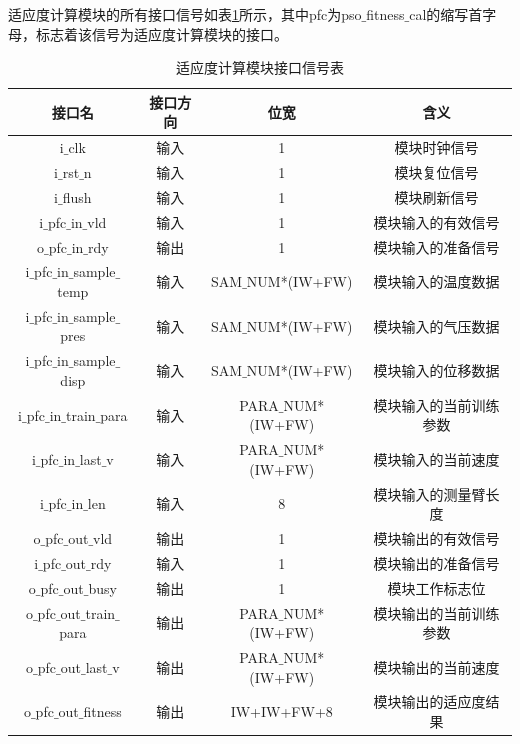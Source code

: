适应度计算模块的所有接口信号如表\ref{tab:适应度计算模块接口信号表}所示，其中pfc为pso$\_$fitness$\_$cal的缩写首字母，标志着该信号为适应度计算模块的接口。
\begin{table}[H]
    \centering
    \caption{适应度计算模块接口信号表}
    \label{tab:适应度计算模块接口信号表}
    \begin{tabular}{c|c|c|c}
        \hline
        接口名                               & 接口方向  & 位宽               &含义                        \\ \hline
        i$\_$clk                            & 输入      & 1                     & 模块时钟信号             \\ \hline
        i$\_$rst$\_$n                       & 输入      & 1                     & 模块复位信号             \\ \hline
        i$\_$flush                          & 输入      & 1                     & 模块刷新信号             \\ \hline
        i$\_$pfc$\_$in$\_$vld               & 输入      & 1                     & 模块输入的有效信号        \\ \hline
        o$\_$pfc$\_$in$\_$rdy               & 输出      & 1                     & 模块输入的准备信号        \\ \hline
        i$\_$pfc$\_$in$\_$sample$\_$temp    & 输入      & SAM$\_$NUM*(IW+FW)    & 模块输入的温度数据        \\ \hline
        i$\_$pfc$\_$in$\_$sample$\_$pres    & 输入      & SAM$\_$NUM*(IW+FW)    & 模块输入的气压数据        \\ \hline
        i$\_$pfc$\_$in$\_$sample$\_$disp    & 输入      & SAM$\_$NUM*(IW+FW)    & 模块输入的位移数据        \\ \hline
        i$\_$pfc$\_$in$\_$train$\_$para     & 输入      & PARA$\_$NUM*(IW+FW)   & 模块输入的当前训练参数     \\ \hline
        i$\_$pfc$\_$in$\_$last$\_$v         & 输入      & PARA$\_$NUM*(IW+FW)   & 模块输入的当前速度        \\ \hline
        i$\_$pfc$\_$in$\_$len               & 输入      & 8                     & 模块输入的测量臂长度      \\ \hline
        o$\_$pfc$\_$out$\_$vld              & 输出      & 1                     & 模块输出的有效信号        \\ \hline
        i$\_$pfc$\_$out$\_$rdy              & 输入      & 1                     & 模块输出的准备信号        \\ \hline
        o$\_$pfc$\_$out$\_$busy             & 输出      & 1                     & 模块工作标志位            \\ \hline
        o$\_$pfc$\_$out$\_$train$\_$para    & 输出      & PARA$\_$NUM*(IW+FW)   & 模块输出的当前训练参数     \\ \hline
        o$\_$pfc$\_$out$\_$last$\_$v        & 输出      & PARA$\_$NUM*(IW+FW)   & 模块输出的当前速度         \\ \hline
        o$\_$pfc$\_$out$\_$fitness          & 输出      & IW+IW+FW+8            & 模块输出的适应度结果       \\ \hline
    \end{tabular}
  \end{table}

